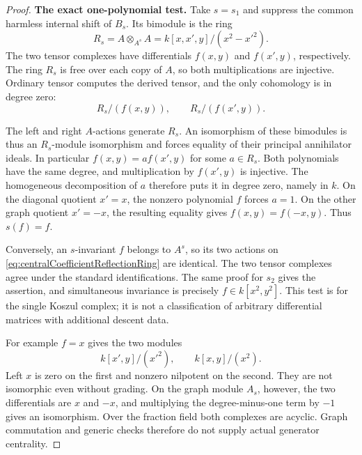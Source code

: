 \begin{proof}
\par\smallskip\noindent\textbf{The exact one-polynomial test.}\quad
Take \(s=s_1\) and suppress the common harmless
internal shift of \(B_s\). Its bimodule is the ring
\begin{equation}\label{eq:centralCoefficientReflectionRing}
 R_s=A\otimes_{A^s}A
     =k[x,x',y]/(x^2-x'^2).
\end{equation}
The two tensor complexes have differentials
\(f(x,y)\) and \(f(x',y)\), respectively.
The ring \(R_s\) is free over each copy of \(A\),
so both multiplications are injective. Ordinary
tensor computes the derived tensor, and the only
cohomology is in degree zero:
\begin{equation}\label{eq:centralCoefficientAnnihilators}
 R_s/(f(x,y)),\qquad R_s/(f(x',y)).
\end{equation}

The left and right \(A\)-actions generate \(R_s\).
An isomorphism of these bimodules is thus an
\(R_s\)-module isomorphism and forces equality
of their principal annihilator ideals.
In particular \(f(x,y)=a f(x',y)\) for some
\(a\in R_s\). Both polynomials have the same
degree, and multiplication by \(f(x',y)\) is
injective. The homogeneous decomposition of \(a\)
therefore puts it in degree zero, namely in \(k\).
On the diagonal quotient \(x'=x\), the nonzero
polynomial \(f\) forces \(a=1\).
On the other graph quotient \(x'=-x\), the
resulting equality gives \(f(x,y)=f(-x,y)\).
Thus \(s(f)=f\).

Conversely, an \(s\)-invariant \(f\) belongs
to \(A^s\), so its two actions on
\eqref{eq:centralCoefficientReflectionRing} are
identical. The two tensor complexes agree under
the standard identifications. The same proof for
\(s_2\) gives the assertion, and simultaneous
invariance is precisely \(f\in k[x^2,y^2]\).
This test is for the single Koszul complex; it is
not a classification of arbitrary differential
matrices with additional descent data.

For example \(f=x\) gives the two modules
\[
 k[x',y]/(x'^2),\qquad k[x,y]/(x^2).
\]
Left \(x\) is zero on the first and nonzero
nilpotent on the second. They are not isomorphic
even without grading.
On the graph module \(A_s\), however, the two
differentials are \(x\) and \(-x\), and multiplying
the degree-minus-one term by \(-1\) gives an
isomorphism. Over the fraction field both complexes
are acyclic. Graph commutation and generic checks
therefore do not supply actual generator centrality.


\end{proof}
